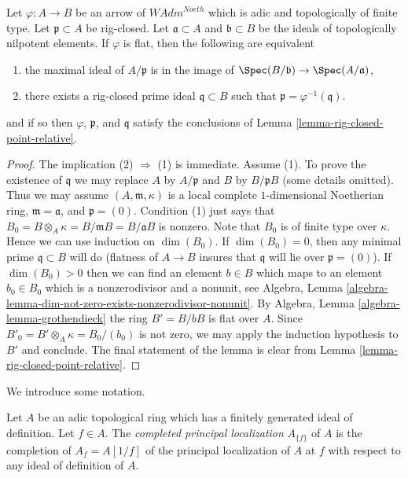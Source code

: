 \begin{lemma}
\label{lemma-rig-closed-point-in-image}
Let $\varphi : A \to B$ be an arrow of $\textit{WAdm}^{Noeth}$
which is adic and topologically of finite type.
Let $\mathfrak p \subset A$ be rig-closed.
Let $\mathfrak a \subset A$ and $\mathfrak b \subset B$
be the ideals of topologically nilpotent elements. If $\varphi$
is flat, then the following are equivalent
\begin{enumerate}
\item the maximal ideal of $A/\mathfrak p$ is in the image of
$\Spec(B/\mathfrak b) \to \Spec(A/\mathfrak a)$,
\item there exists a rig-closed prime ideal $\mathfrak q \subset B$
such that $\mathfrak p = \varphi^{-1}(\mathfrak q)$.
\end{enumerate}
and if so then $\varphi$, $\mathfrak p$, and $\mathfrak q$
satisfy the conclusions of Lemma \ref{lemma-rig-closed-point-relative}.
\end{lemma}

\begin{proof}
The implication (2) $\Rightarrow$ (1) is immediate. Assume (1).
To prove the existence of $\mathfrak q$
we may replace $A$ by $A/\mathfrak p$ and $B$ by $B/\mathfrak p B$
(some details omitted). Thus we may assume $(A, \mathfrak m, \kappa)$
is a local complete $1$-dimensional Noetherian ring,
$\mathfrak m = \mathfrak a$, and $\mathfrak p = (0)$. Condition (1)
just says that $B_0 = B \otimes_A \kappa = B/\mathfrak m B = B/\mathfrak a B$
is nonzero. Note that $B_0$ is of finite type over $\kappa$.
Hence we can use induction on $\dim(B_0)$.
If $\dim(B_0) = 0$, then any minimal prime $\mathfrak q \subset B$
will do (flatness of $A \to B$ insures that $\mathfrak q$ will
lie over $\mathfrak p = (0)$).
If $\dim(B_0) > 0$ then we can find an element $b \in B$
which maps to an element $b_0 \in B_0$ which is a nonzerodivisor
and a nonunit, see Algebra, Lemma
\ref{algebra-lemma-dim-not-zero-exists-nonzerodivisor-nonunit}.
By Algebra, Lemma \ref{algebra-lemma-grothendieck}
the ring $B' = B/bB$ is flat over $A$. Since
$B'_0 = B' \otimes_A \kappa = B_0/(b_0)$ is not zero,
we may apply the induction hypothesis to $B'$ and conclude.
The final statement of the lemma is clear from
Lemma \ref{lemma-rig-closed-point-relative}.
\end{proof}

\noindent
We introduce some notation.

\begin{definition}
\label{definition-completed-principal-localization}
Let $A$ be an adic topological ring which has a finitely generated ideal
of definition. Let $f \in A$. The {\it completed principal localization}
$A_{\{f\}}$ of $A$ is the completion of $A_f = A[1/f]$
of the principal localization of $A$ at $f$ with respect to any
ideal of definition of $A$.
\end{definition}

